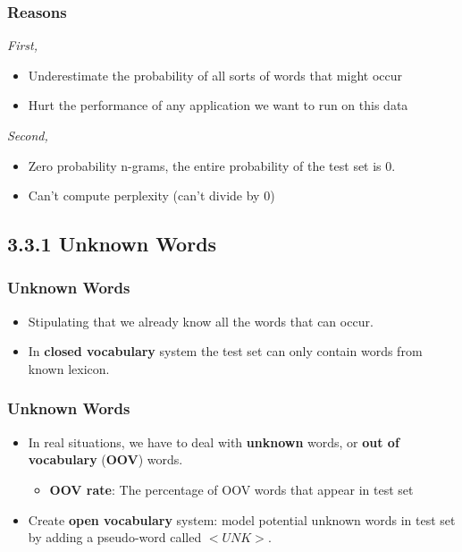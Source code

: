 \documentclass[13.5pt,aspecratio=169]{beamer}
\begin{document}
    \begin{frame}
            \frametitle{Reasons}
        \begin{block}{\textit{First,}}
                \begin{itemize}
                    \item Underestimate the probability of all sorts of words that might occur
                    \item Hurt the performance of any application we want to run on this data
                \end{itemize}
        \end{block}
            \pause
        \begin{block}{\textit{Second,}}
                \begin{itemize}
                    \item Zero probability n-grams, the entire probability of the test set is 0.
                    \item Can’t compute perplexity (can’t divide by 0)
                \end{itemize}
        \end{block}
    \end{frame}
    
    
    \subsection{3.3.1 Unknown Words}
    \begin{frame}
        \frametitle{Unknown Words}
        \begin{itemize}
            \item Stipulating that we already know all the words that can occur.
            \item In \textbf{closed vocabulary} system the test set can only contain words from known lexicon.
        \end{itemize}
    \end{frame}
    
    
    \begin{frame}
        \frametitle{Unknown Words}
        \begin{itemize}
            \item In real situations, we have to deal with \textbf{unknown} words, or \textbf{out of vocabulary} (\textbf{OOV}) words.
            \begin{itemize}
                \item \textbf{OOV rate}: The percentage of OOV words that appear in test set
            \end{itemize}
            \item Create \textbf{open vocabulary} system: model potential unknown words in test set by adding a pseudo-word called $<UNK>$.
        \end{itemize}
    \end{frame}
    
\end{document}
